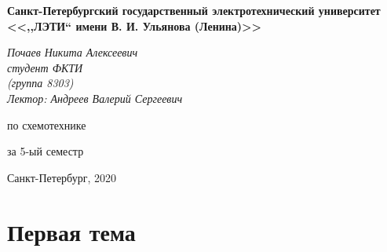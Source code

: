 


\thispagestyle{empty}
\begin{center}
	\textbf{Санкт-Петербургский государственный электротехнический университет \\ <<,,\hspace{0.5pt}ЛЭТИ\hspace{0.5pt}`` имени В. И. Ульянова (Ленина)>>}
\end{center}
\vspace{13ex}
\begin{flushright} %
	\noindent %
	\textit{Почаев Никита Алексеевич}
	\\
	\textit{студент ФКТИ \\(группа 8303)}
	\\
	\textit{Лектор: Андреев Валерий Сергеевич}
\end{flushright}
\begin{center}
	\vspace{13ex}
	\vspace{1ex}
	
	по схемотехнике
	
	
	за 5-ый семестр
	
	
	\vfill %
	{\small Санкт-Петербург, 2020}
\end{center}

\newpage

\section{Первая тема}



\newpage

\tableofcontents

